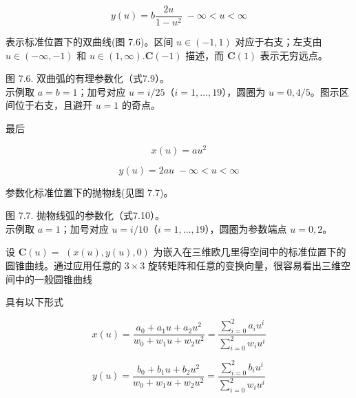 \documentclass[../main.tex]{subfiles}
\begin{document}
\[
y\left( u\right)  = b\frac{2u}{1 - {u}^{2}}\; - \infty  < u < \infty  \tag{7.9}
\]

表示标准位置下的双曲线(图 7.6)。区间 \(u \in  \left( {-1,1}\right)\) 对应于右支；左支由 \(u \in  \left( {-\infty , - 1}\right)\) 和 \(u \in  \left( {1,\infty }\right) .\mathbf{C}\left( {-1}\right)\) 描述，而 \(\mathbf{C}\left( 1\right)\) 表示无穷远点。

\begin{center}
\begin{minipage}{16cm}
\vspace*{.6\baselineskip}
\centering
{}
\par\smallskip
图 7.6. 双曲弧的有理参数化（式7.9）。\\
示例取 $a=b=1$；加号对应 $u=i/25$（$i=1,\ldots,19$），圆圈为 $u=0,4/5$。图示区间位于右支，且避开 $u=1$ 的奇点。
\end{minipage}
\end{center}

最后

\[
x\left( u\right)  = a{u}^{2}
\]

\[
y\left( u\right)  = {2au}\; - \infty  < u < \infty  \tag{7.10}
\]

参数化标准位置下的抛物线(见图 7.7)。

\begin{center}
\begin{minipage}{16cm}
\vspace*{.6\baselineskip}
\centering
{}
\par\smallskip
图 7.7. 抛物线弧的参数化（式7.10）。\\
示例取 $a=1$；加号对应 $u=i/10$（$i=1,\ldots,19$），圆圈为参数端点 $u=0,2$。
\end{minipage}
\end{center}

设 \(\mathbf{C}\left( u\right)  =\)  \(\left( {x\left( u\right) ,y\left( u\right) ,0}\right)\) 为嵌入在三维欧几里得空间中的标准位置下的圆锥曲线。通过应用任意的 \(3 \times  3\) 旋转矩阵和任意的变换向量，很容易看出三维空间中的一般圆锥曲线

具有以下形式

\[
x\left( u\right)  = \frac{{a}_{0} + {a}_{1}u + {a}_{2}{u}^{2}}{{w}_{0} + {w}_{1}u + {w}_{2}{u}^{2}} = \frac{\mathop{\sum }\limits_{{i = 0}}^{2}{a}_{i}{u}^{i}}{\mathop{\sum }\limits_{{i = 0}}^{2}{w}_{i}{u}^{i}}
\]


\[
y\left( u\right)  = \frac{{b}_{0} + {b}_{1}u + {b}_{2}{u}^{2}}{{w}_{0} + {w}_{1}u + {w}_{2}{u}^{2}} = \frac{\mathop{\sum }\limits_{{i = 0}}^{2}{b}_{i}{u}^{i}}{\mathop{\sum }\limits_{{i = 0}}^{2}{w}_{i}{u}^{i}}
\]
\end{document}
